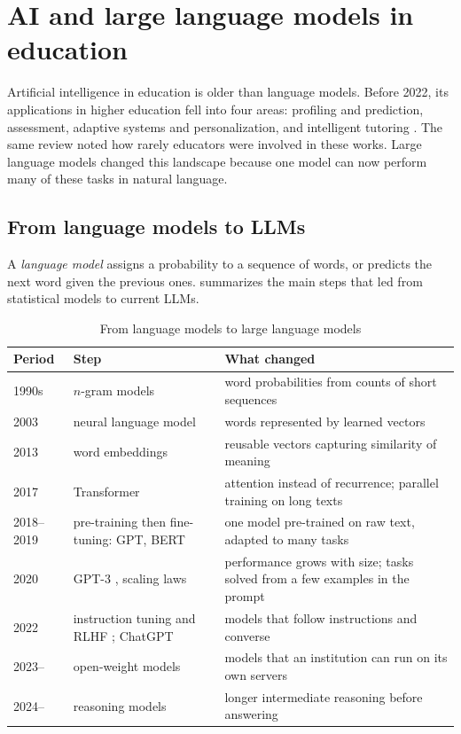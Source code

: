 \section{AI and large language models in education}
\label{sec-llm}

Artificial intelligence in education is older than language models.
Before 2022, its applications in higher education fell into four areas:
profiling and prediction, assessment, adaptive systems and personalization,
and intelligent tutoring \cite{zawacki2019}. The same review noted how
rarely educators were involved in these works. Large language models
changed this landscape because one model can now perform many of these
tasks in natural language.

\subsection{From language models to LLMs}
\label{subsec-llm-history}

A \emph{language model} assigns a probability to a sequence of words, or
predicts the next word given the previous ones. 
summarizes the main steps that led from statistical models to current
LLMs.

\begin{table}[htbp]
\centering
\caption{From language models to large language models}
\label{tab-lm-history}
\small
\begin{tabularx}{\textwidth}{@{}L{1.7cm}L{4.3cm}Y@{}}
\toprule
\textbf{Period} & \textbf{Step} & \textbf{What changed} \\
\midrule
1990s & $n$-gram models & word probabilities from counts of short sequences \\
2003 & neural language model \cite{bengio2003} & words represented by learned vectors \\
2013 & word embeddings \cite{mikolov2013} & reusable vectors capturing similarity of meaning \\
2017 & Transformer \cite{vaswani2017} & attention instead of recurrence; parallel training on long texts \\
2018--2019 & pre-training then fine-tuning: GPT, BERT \cite{radford2018,devlin2019} & one model pre-trained on raw text, adapted to many tasks \\
2020 & GPT-3 \cite{brown2020}, scaling laws \cite{kaplan2020} & performance grows with size; tasks solved from a few examples in the prompt \\
2022 & instruction tuning and RLHF \cite{ouyang2022}; ChatGPT & models that follow instructions and converse \\
2023-- & open-weight models \cite{touvron2023,qwen3,gptoss2025} & models that an institution can run on its own servers \\
2024-- & reasoning models \cite{deepseekr1} & longer intermediate reasoning before answering \\
\bottomrule
\end{tabularx}
\end{table}

